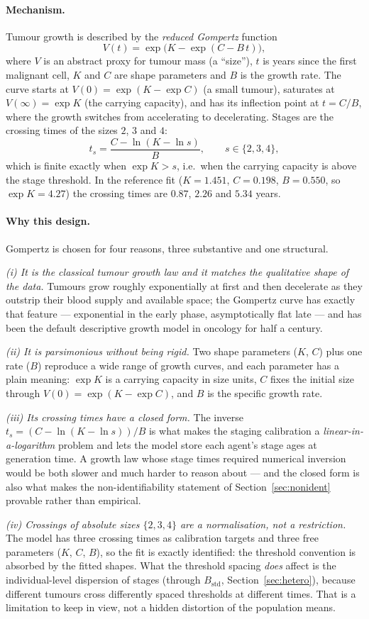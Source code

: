 \documentclass[12pt,a4paper]{article}
\newcommand{\mech}[1]{\paragraph{Mechanism.} #1}
\newcommand{\why}[1]{\paragraph{Why this design.} #1}
\begin{document}
\mech{Tumour growth is described by the \emph{reduced Gompertz} function
\[
V(t) = \exp\!\bigl(K - \exp(C - B\,t)\bigr),
\]
where $V$ is an abstract proxy for tumour mass (a ``size''), $t$ is years since the first malignant cell,
$K$ and $C$ are shape parameters and $B$ is the growth rate. The curve starts at
$V(0) = \exp(K - \exp C)$ (a small tumour), saturates at $V(\infty) = \exp K$ (the carrying capacity), and
has its inflection point at $t = C/B$, where the growth switches from accelerating to decelerating. Stages
are the crossing times of the sizes $2$, $3$ and $4$:
\[
t_s = \frac{C - \ln(K - \ln s)}{B}, \qquad s \in \{2,3,4\},
\]
which is finite exactly when $\exp K > s$, i.e.\ when the carrying capacity is above the stage threshold.
In the reference fit ($K = 1.451$, $C = 0.198$, $B = 0.550$, so $\exp K = 4.27$) the crossing times are
$0.87$, $2.26$ and $5.34$ years.}

\why{Gompertz is chosen for four reasons, three substantive and one structural.

\emph{(i) It is the classical tumour growth law and it matches the qualitative shape of the data.} Tumours
grow roughly exponentially at first and then decelerate as they outstrip their blood supply and available
space; the Gompertz curve has exactly that feature --- exponential in the early phase, asymptotically flat
late --- and has been the default descriptive growth model in oncology for half a century.

\emph{(ii) It is parsimonious without being rigid.} Two shape parameters ($K$, $C$) plus one rate ($B$)
reproduce a wide range of growth curves, and each parameter has a plain meaning: $\exp K$ is a carrying
capacity in size units, $C$ fixes the initial size through $V(0) = \exp(K - \exp C)$, and $B$ is the
specific growth rate.

\emph{(iii) Its crossing times have a closed form.} The inverse
$t_s = (C - \ln(K - \ln s))/B$ is what makes the staging calibration a \emph{linear-in-a-logarithm}
problem and lets the model store each agent's stage ages at generation time. A growth law whose stage
times required numerical inversion would be both slower and much harder to reason about --- and the
closed form is also what makes the non-identifiability statement of Section~\ref{sec:nonident} provable
rather than empirical.

\emph{(iv) Crossings of absolute sizes $\{2,3,4\}$ are a normalisation, not a restriction.} The model has
three crossing times as calibration targets and three free parameters ($K$, $C$, $B$), so the fit is
exactly identified: the threshold convention is absorbed by the fitted shapes. What the threshold spacing
\emph{does} affect is the individual-level dispersion of stages (through $B_{\text{std}}$,
Section~\ref{sec:hetero}), because different tumours cross differently spaced thresholds at different
times. That is a limitation to keep in view, not a hidden distortion of the population means.}
\end{document}
